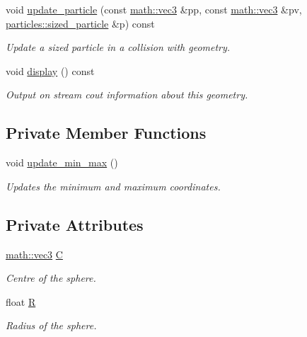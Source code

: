 \begin{DoxyCompactItemize}
void \hyperlink{classphysim_1_1geometric_1_1sphere_a3c395dccc5e2c8995e28767419fe59d6}{update\+\_\+particle} (const \hyperlink{structphysim_1_1math_1_1vec3}{math\+::vec3} \&pp, const \hyperlink{structphysim_1_1math_1_1vec3}{math\+::vec3} \&pv, \hyperlink{classphysim_1_1particles_1_1sized__particle}{particles\+::sized\+\_\+particle} \&p) const
\begin{DoxyCompactList}\small\item\em Update a sized particle in a collision with geometry. \end{DoxyCompactList}\item 
\mbox{\label{classphysim_1_1geometric_1_1sphere_a9f69443b4e75cb1658a0f549ea16acd2}} 
void \hyperlink{classphysim_1_1geometric_1_1sphere_a9f69443b4e75cb1658a0f549ea16acd2}{display} () const
\begin{DoxyCompactList}\small\item\em Output on stream {\itshape cout} information about this geometry. \end{DoxyCompactList}\end{DoxyCompactItemize}
\subsection*{Private Member Functions}
\begin{DoxyCompactItemize}
\item 
void \hyperlink{classphysim_1_1geometric_1_1sphere_a86fbbf341725677864abc6c692096a26}{update\+\_\+min\+\_\+max} ()
\begin{DoxyCompactList}\small\item\em Updates the minimum and maximum coordinates. \end{DoxyCompactList}\end{DoxyCompactItemize}
\subsection*{Private Attributes}
\begin{DoxyCompactItemize}
\item 
\mbox{\label{classphysim_1_1geometric_1_1sphere_a86e4765055bbc7c63a015c843a39419b}} 
\hyperlink{structphysim_1_1math_1_1vec3}{math\+::vec3} \hyperlink{classphysim_1_1geometric_1_1sphere_a86e4765055bbc7c63a015c843a39419b}{C}
\begin{DoxyCompactList}\small\item\em Centre of the sphere. \end{DoxyCompactList}\item 
\mbox{\label{classphysim_1_1geometric_1_1sphere_aeeb973925c846ad710d397a9281dc939}} 
float \hyperlink{classphysim_1_1geometric_1_1sphere_aeeb973925c846ad710d397a9281dc939}{R}
\begin{DoxyCompactList}\small\item\em Radius of the sphere. \end{DoxyCompactList}\end{DoxyCompactItemize}
